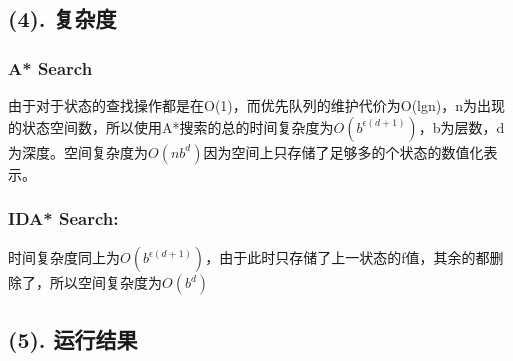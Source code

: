 \documentclass{article}
\begin{document}
	\subsection*{(4). 复杂度}
	\subsubsection*{A* Search}
	由于对于状态的查找操作都是在O(1)，而优先队列的维护代价为O(lgn)，n为出现的状态空间数，所以使用A*搜索的总的时间复杂度为$O(b^{\epsilon(d+1)})$，b为层数，d为深度。空间复杂度为$O(nb^{d})$因为空间上只存储了足够多的个状态的数值化表示。
	\subsubsection*{IDA* Search:}
	时间复杂度同上为$O(b^{\epsilon(d+1)})$，由于此时只存储了上一状态的f值，其余的都删除了，所以空间复杂度为$O(b^{d})$
	\subsection*{(5). 运行结果}
\end{document}
